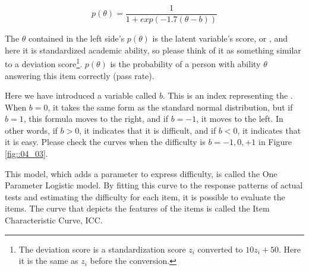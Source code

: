 \documentclass{ltjsbook}
\begin{document}
\[ p(\theta) = \frac{1}{1+exp(-1.7 (\theta - b))} \]

The $\theta$ contained in the left side's $p(\theta)$ is the latent variable's score, or , and here it is standardized academic ability, so please think of it as something similar to a deviation score\footnote{The deviation score is a standardization score $z_i$ converted to $10z_i+50$. Here it is the same as $z_i$ before the conversion.}. $p(\theta)$ is the probability of a person with ability $\theta$ answering this item correctly (pass rate).

Here we have introduced a variable called $b$. This is an index representing the . When $b=0$, it takes the same form as the standard normal distribution, but if $b=1$, this formula moves to the right, and if $b=-1$, it moves to the left. In other words, if $b>0$, it indicates that it is difficult, and if $b<0$, it indicates that it is easy. Please check the curves when the difficulty is $b=-1,0,+1$ in Figure \ref{fig::04_03}.

This model, which adds a parameter to express difficulty, is called the One Parameter Logistic model. By fitting this curve to the response patterns of actual tests and estimating the difficulty for each item, it is possible to evaluate the items. The curve that depicts the features of the items is called the Item Characteristic Curve, ICC.
\end{document}
